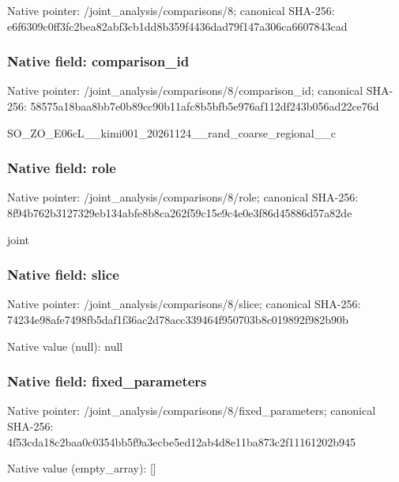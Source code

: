 \documentclass[10pt,a4paper]{article}
\begin{document}
Native pointer: /joint\_analysis/comparisons/8; canonical SHA-256: e6f6309c0ff3fc2bea82abf3\allowbreak{}cb1dd8b359f4436dad79f147\allowbreak{}a306ca6607843cad



\subsubsection{Native field: comparison\_id}


Native pointer: /joint\_analysis/comparis\allowbreak{}ons/8/comparison\_id; canonical SHA-256: 58575a18baa8bb7e0b89cc90\allowbreak{}b11afc8b5bfb5e976af112df\allowbreak{}243b056ad22ce76d


SO\_ZO\_E06cL\_\_kimi001\_202\allowbreak{}61124\_\_rand\_coarse\_regio\allowbreak{}nal\_\_c


\subsubsection{Native field: role}


Native pointer: /joint\_analysis/comparisons/8/role; canonical SHA-256: 8f94b762b3127329eb134abf\allowbreak{}e8b8ca262f59c15e9c4e0e3f\allowbreak{}86d45886d57a82de


joint


\subsubsection{Native field: slice}


Native pointer: /joint\_analysis/comparisons/8/slice; canonical SHA-256: 74234e98afe7498fb5daf1f3\allowbreak{}6ac2d78acc339464f950703b\allowbreak{}8c019892f982b90b



Native value (null): null



\subsubsection{Native field: fixed\_parameters}


Native pointer: /joint\_analysis/comparis\allowbreak{}ons/8/fixed\_parameters; canonical SHA-256: 4f53cda18c2baa0c0354bb5f\allowbreak{}9a3ecbe5ed12ab4d8e11ba87\allowbreak{}3c2f11161202b945



Native value (empty\_array): []
\end{document}
